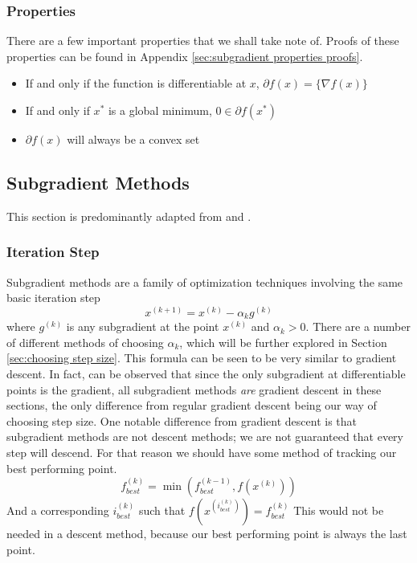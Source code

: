 \documentclass[journal,onecolumn]{IEEEtran}
\begin{document}
\subsubsection{Properties}
There are a few important properties that we shall take note of. Proofs of these properties can be found in Appendix \ref{sec:subgradient properties proofs}.
\begin{itemize}
    \item If and only if the function is differentiable at \(x\), \(\partial f(x) = \{\nabla f(x)\}\)
    \item If and only if \(x^*\) is a global minimum, \(0 \in \partial f(x^*)\)
    \item \(\partial f(x)\) will always be a convex set
\end{itemize}

\subsection{Subgradient Methods}\label{sec:subgradient methods}
This section is predominantly adapted from \cite{boydparksubgradients} and \cite{boydxiaosubgradients}.

\subsubsection{Iteration Step}
Subgradient methods are a family of optimization techniques involving the same basic iteration step
\begin{equation}\label{eq:subgradient method iteration}
x^{(k+1)} = x^{(k)} - \alpha_k g^{(k)}
\end{equation}
where \(g^{(k)}\) is any subgradient at the point \(x^{(k)}\) and \(\alpha_k > 0\). There are a number of different methods of choosing \(\alpha_k\), which will be further explored in Section \ref{sec:choosing step size}. This formula can be seen to be very similar to gradient descent. In fact, can be observed that since the only subgradient at differentiable points is the gradient, all subgradient methods \textit{are} gradient descent in these sections, the only difference from regular gradient descent being our way of choosing step size. One notable difference from gradient descent is that subgradient methods are not descent methods; we are not guaranteed that every step will descend. For that reason we should have some method of tracking our best performing point.
\begin{equation}\label{eq:track best}
f^{(k)}_{best} = \min (f^{(k-1)}_{best}, f(x^{(k)}))
\end{equation}
And a corresponding \(i^{(k)}_{best}\) such that \(f(x^{(i^{(k)}_{best})}) = f^{(k)}_{best}\)
This would not be needed in a descent method, because our best performing point is always the last point.
\end{document}
